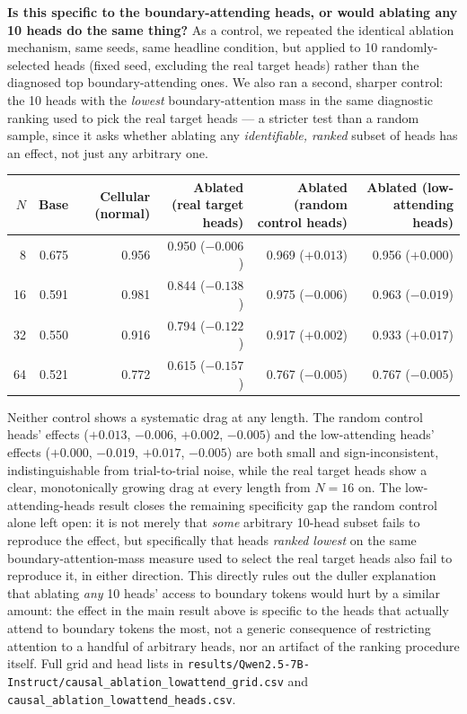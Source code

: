\documentclass[11pt]{article}
\begin{document}
\textbf{Is this specific to the boundary-attending heads, or would ablating any 10 heads do the same thing?} As a control, we repeated the identical ablation mechanism, same seeds, same headline condition, but applied to 10 randomly-selected heads (fixed seed, excluding the real target heads) rather than the diagnosed top boundary-attending ones. We also ran a second, sharper control: the 10 heads with the \emph{lowest} boundary-attention mass in the same diagnostic ranking used to pick the real target heads --- a stricter test than a random sample, since it asks whether ablating any \emph{identifiable, ranked} subset of heads has an effect, not just any arbitrary one.

\begin{table}[htbp]
\centering
\small
\begin{tabular}{rrrrrr}
\toprule
$N$ & Base & Cellular (normal) & Ablated (real target heads) & Ablated (random control heads) & Ablated (low-attending heads) \\
\midrule
8  & 0.675 & 0.956 & 0.950 ($-0.006$) & 0.969 ($+0.013$) & 0.956 ($+0.000$) \\
16 & 0.591 & 0.981 & 0.844 ($-0.138$) & 0.975 ($-0.006$) & 0.963 ($-0.019$) \\
32 & 0.550 & 0.916 & 0.794 ($-0.122$) & 0.917 ($+0.002$) & 0.933 ($+0.017$) \\
64 & 0.521 & 0.772 & 0.615 ($-0.157$) & 0.767 ($-0.005$) & 0.767 ($-0.005$) \\
\bottomrule
\end{tabular}
\end{table}

Neither control shows a systematic drag at any length. The random control heads' effects ($+0.013$, $-0.006$, $+0.002$, $-0.005$) and the low-attending heads' effects ($+0.000$, $-0.019$, $+0.017$, $-0.005$) are both small and sign-inconsistent, indistinguishable from trial-to-trial noise, while the real target heads show a clear, monotonically growing drag at every length from $N=16$ on. The low-attending-heads result closes the remaining specificity gap the random control alone left open: it is not merely that \emph{some} arbitrary 10-head subset fails to reproduce the effect, but specifically that heads \emph{ranked lowest} on the same boundary-attention-mass measure used to select the real target heads also fail to reproduce it, in either direction. This directly rules out the duller explanation that ablating \emph{any} 10 heads' access to boundary tokens would hurt by a similar amount: the effect in the main result above is specific to the heads that actually attend to boundary tokens the most, not a generic consequence of restricting attention to a handful of arbitrary heads, nor an artifact of the ranking procedure itself. Full grid and head lists in \texttt{results/Qwen2.5-7B-Instruct/causal\_ablation\_lowattend\_grid.csv} and \texttt{causal\_ablation\_lowattend\_heads.csv}.
\end{document}

